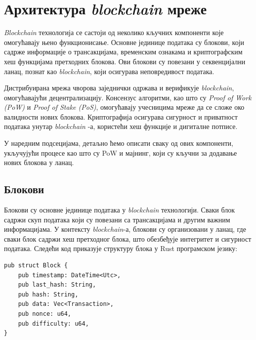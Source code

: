 \documentclass[12pt, a4paper]{article}
\begin{document}
\newpage
\section{Архитектура \textit{blockchain} мреже}
\textit{Blockchain} технологија се састоји од неколико кључних компоненти које омогућавају њено функционисање. Основне јединице података су блокови, који садрже информације о трансакцијама, временским ознакама и криптографским хеш функцијама претходних блокова. Ови блокови су повезани у секвенцијални ланац, познат као \textit{blockchain}, који осигурава неповредивост података. 

Дистрибуирана мрежа чворова заједнички одржава и верификује \textit{blockchain}, омогућавајући децентрализацију. Консензус алгоритми, као што су \textit{Proof of Work (PoW)} и \textit{Proof of Stake (PoS)}, омогућавају учесницима мреже да се сложе око валидности нових блокова. Криптографија осигурава сигурност и приватност података унутар \textit{blockchain} -а, користећи хеш функције и дигиталне потписе. 

У наредним подсецијама, детаљно ћемо описати сваку од ових компоненти, укључујући процесе као што су PoW и мајнинг, који су кључни за додавање нових блокова у ланац.


\subsection{Блокови}
Блокови су основне јединице података у \textit{blockchain} технологији. Сваки блок садржи скуп података који су повезани са трансакцијама и другим важним информацијама. У контексту \textit{blockchain}-а, блокови су организовани у ланац, где сваки блок садржи хеш претходног блока, што обезбеђује интегритет и сигурност података. Следећи код приказује структуру блока у Rust програмском језику:

\begin{verbatim}
pub struct Block {
    pub timestamp: DateTime<Utc>,
    pub last_hash: String,
    pub hash: String,
    pub data: Vec<Transaction>,
    pub nonce: u64,
    pub difficulty: u64,
}
\end{verbatim}
\end{document}
